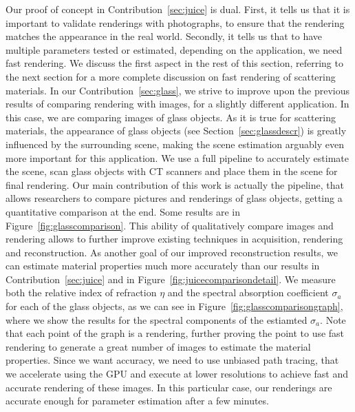 Our proof of concept in Contribution~\ref{sec:juice} is dual. First, it tells us that it is important to validate renderings with photographs, to ensure that the rendering matches the appearance in the real world. Secondly, it tells us that to have multiple parameters tested or estimated, depending on the application, we need fast rendering. We discuss the first aspect in the rest of this section, referring to the next section for a more complete discussion on fast rendering of scattering materials. In our Contribution~\ref{sec:glass}, we strive to improve upon the previous results of comparing rendering with images, for a slightly different application. In this case, we are comparing images of glass objects. As it is true for scattering materials, the appearance of glass objects (see Section~\ref{sec:glassdescr}) is greatly influenced by the surrounding scene, making the scene estimation arguably even more important for this application. We use a full pipeline to accurately estimate the scene, scan glass objects with CT scanners and place them in the scene for final rendering. Our main contribution of this work is actually the pipeline, that allows researchers to compare pictures and renderings of glass objects, getting a quantitative comparison at the end. Some results are in Figure~\ref{fig:glasscomparison}. This ability of qualitatively compare images and rendering allows to further improve existing techniques in acquisition, rendering and reconstruction. As another goal of our improved reconstruction results, we can estimate material properties much more accurately than our  results in Contribution~\ref{sec:juice} and in Figure~\ref{fig:juicecomparisondetail}. We measure both the relative index of refraction $\eta$ and the spectral absorption coefficient $\sigma_a$ for each of the glass objects, as we can see in Figure~\ref{fig:glasscomparisongraph}, where we show the results for the spectral components of the estiamted $\sigma_a$. Note that each point of the graph is a rendering, further proving the point to use fast rendering to generate a great number of images to estimate the material properties. Since we want accuracy, we need to use unbiased path tracing, that we accelerate using the GPU and execute at lower resolutions to achieve fast and accurate rendering of these images. In this particular case, our renderings are accurate enough for parameter estimation after a few minutes. 

